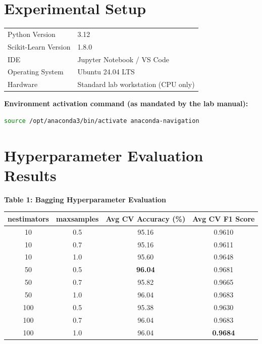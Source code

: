 \documentclass[12pt,a4paper]{article}
\newenvironment{fitwidth}
  {\begin{lrbox}{\fitbox}}
  {\end{lrbox}\ifdim\wd\fitbox>\linewidth\resizebox{\linewidth}{!}{\usebox{\fitbox}}\else\usebox{\fitbox}\fi}
\DeclareRobustCommand{\_}{\textunderscore\allowbreak}
\begin{document}
\section{Experimental Setup}
\begin{center}
\begin{minipage}{\linewidth}\centering
\begin{fitwidth}
\begin{tabular}{ll}
\toprule
Python Version & 3.12 \\
Scikit-Learn Version & 1.8.0 \\
IDE & Jupyter Notebook / VS Code \\
Operating System & Ubuntu 24.04 LTS \\
Hardware & Standard lab workstation (CPU only) \\
\bottomrule
\end{tabular}
\end{fitwidth}
\end{minipage}
\end{center}

\vspace{0.3cm}
\textbf{Environment activation command (as mandated by the lab manual):}
\begin{lstlisting}[language=bash]
source /opt/anaconda3/bin/activate anaconda-navigation
\end{lstlisting}

\section{Hyperparameter Evaluation Results}

\begin{center}
\begin{minipage}{\linewidth}\centering
\textbf{Table 1: Bagging Hyperparameter Evaluation}\par\smallskip
\begin{fitwidth}
\begin{tabular}{ccc c}
\toprule
n\_estimators & max\_samples & Avg CV Accuracy (\%) & Avg CV F1 Score \\
\midrule
10  & 0.5 & 95.16 & 0.9610 \\
10  & 0.7 & 95.16 & 0.9611 \\
10  & 1.0 & 95.60 & 0.9648 \\
50  & 0.5 & \textbf{96.04} & 0.9681 \\
50  & 0.7 & 95.82 & 0.9665 \\
50  & 1.0 & 96.04 & 0.9683 \\
100 & 0.5 & 95.38 & 0.9630 \\
100 & 0.7 & 96.04 & 0.9683 \\
100 & 1.0 & 96.04 & \textbf{0.9684} \\
\bottomrule
\end{tabular}
\end{fitwidth}
\end{minipage}
\end{center}
\end{document}
